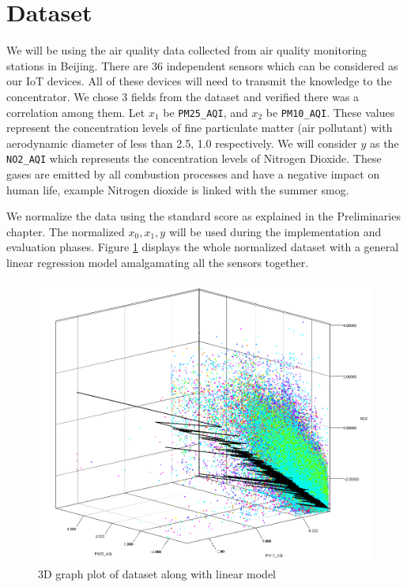 \documentclass{mproj}
\begin{document}
\section{Dataset}
We will be using the air quality data\cite{air-quality-inference-meets-big-data} collected from air quality monitoring stations in Beijing. There are 36 independent sensors which can be considered as our IoT devices. All of these devices will need to transmit the knowledge to the concentrator. We chose 3 fields from the dataset and verified there was a correlation among them. Let $x_1$ be \texttt{PM25\_AQI}, and $x_2$ be \texttt{PM10\_AQI}. These values represent the concentration levels of fine particulate matter (air pollutant) with aerodynamic diameter of less than 2.5, 1.0 respectively. We will consider $y$ as the \texttt{NO2\_AQI} which represents the concentration levels of Nitrogen Dioxide. These gases are emitted by all combustion processes and have a negative impact on human life, example Nitrogen dioxide is linked with the summer smog.\cite{Richter2005}

We normalize the data using the standard score as explained in the Preliminaries chapter. The normalized $x_0,x_1,y$ will be used during the implementation and evaluation phases. Figure \ref{fig:dataset} displays the whole normalized dataset with a general linear regression model amalgamating all the sensors together.

\begin{figure}[H]
\caption{3D graph plot of dataset along with linear model}
\label{fig:dataset}
\centerline{\includegraphics[scale=0.6]{dataset}}
\end{figure}
\end{document}
